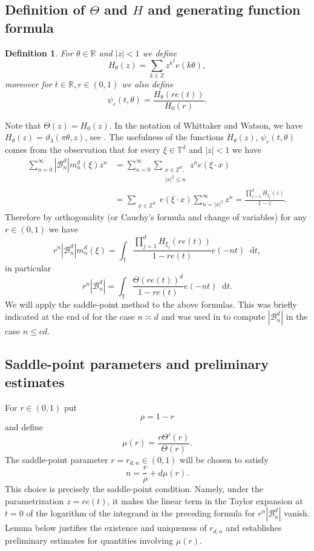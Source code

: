 \documentclass{article}
\newcommand{\Z}{\mathbb Z}
\newcommand{\R}{\mathbb R}
\newcommand{\T}{\mathbb T}
\newcommand{\dd}{\mathop{}\!\mathrm{d}}
\theoremstyle{plain}
\newtheorem{definition}[theorem]{Definition}
\numberwithin{equation}{section}
\begin{document}
\subsection{Definition of $\Theta$ and $H$ and generating function formula}
\begin{definition} \label{defn: defn of H}
    For $\theta \in \R$ and $|z|<1$ we define 
    \[
    H_\theta(z)= \sum_{k \in \Z} z^{k^2} e(k \theta),
    \]
    moreover for $t \in \R, r \in (0,1)$ we also define 
    \[
    \psi_{r}(t, \theta)= \frac{H_{\theta}(re(t))}{H_0(r)}.
    \]
\end{definition}
Note that $\Theta(z)=H_0(z)$. In the notation of Whittaker and Watson, we have
\(H_\theta(z)=\vartheta_3(\pi\theta,z)\), see
\cite[\S~21.11, pp.~463--464]{WhittakerWatson}. The usefulness of the functions $H_\theta(z)$, $\psi_r(t,\theta)$ comes from the observation that for every $\xi \in \T^d$ and $|z|<1$ we have 
\begin{align*}
    \sum_{n=0}^\infty |\mathcal{B}_n^{d}| m_n^d(\xi) z^n&= \sum_{n=0}^\infty \sum_{\substack{x \in \Z^d,\\|x|^2 \le n}}  z^n e(\xi \cdot x)\\ 
    &=  \sum_{\substack{x \in \Z^d}} e(\xi \cdot x)\sum_{n=|x|^2}^\infty z^n =\frac{\prod_{j=1}^d H_{\xi_j}(z)}{1-z}.
\end{align*}
Therefore by orthogonality (or Cauchy's formula and change of variables) for any $r \in (0,1)$ we have 
\begin{equation} \label{eq: Formula for multiplier}
   r^n |\mathcal{B}_n^{d}| m_n^d(\xi)= \int_\T \frac{\prod_{j=1}^d H_{\xi_j}(re(t))}{1-re(t)} e(-nt) \dd t,
\end{equation}
in particular 
\begin{equation*}
   r^n |\mathcal{B}_n^{d}| = \int_\T \frac{\Theta(re(t))^d}{1-re(t)} e(-nt) \dd t.
\end{equation*}
 We will apply the saddle-point method to the above formulas. This was briefly indicated at the end of \cite{MazoOdlyzko} for the case $n\asymp d$ and was used in \cite{NiksinskiWrobel} to compute $|\mathcal B_n^d|$ in the case $n \le cd$. 
\subsection{Saddle-point parameters and preliminary estimates}
\label{ssec: ball proof prelim}
For $r \in (0,1)$ put 
\[\rho=1-r\]
and define 
\[
\mu(r)= \frac{r \Theta'(r)}{\Theta(r)}.
\]
The saddle-point parameter $r=r_{d,n} \in (0,1)$ will be chosen to satisfy
\begin{equation} \label{eq: definition of r}
    n= \frac{r}{\rho}+d \mu(r).
\end{equation}
This choice is precisely the saddle-point condition. Namely, under the
parametrization \(z=re(t)\), it makes the linear term in the Taylor
expansion at \(t=0\) of the logarithm of the integrand in the preceding
formula for \(r^n|\mathcal B_n^d|\) vanish. Lemma below justifies the existence and uniqueness of $r_{d,n}$ and establishes preliminary estimates for quantities involving $\mu(r)$.
\end{document}
